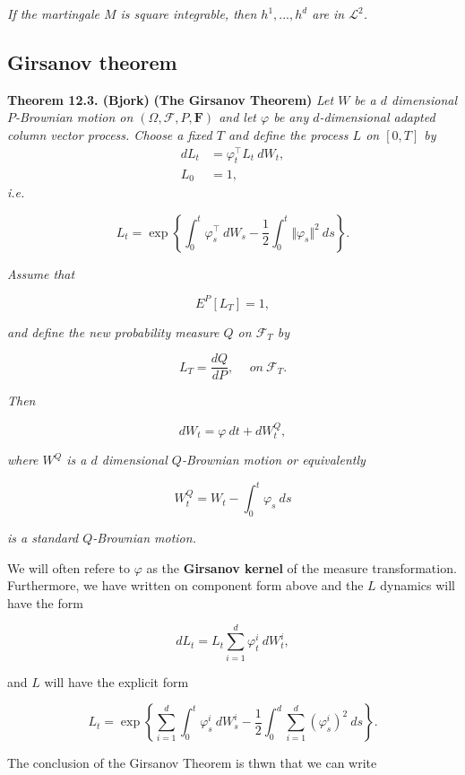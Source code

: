 \documentclass[
]{book}
\begin{document}
\emph{If the martingale \(M\) is square integrable, then \(h^1,...,h^d\) are in \(\mathcal{L}^2\).}

\hypertarget{girsanov-theorem}{%
\subsection{Girsanov theorem}\label{girsanov-theorem}}

\textbf{Theorem 12.3. (Bjork)} \textbf{(The Girsanov Theorem)} \emph{Let \(W\) be a \(d\) dimensional \(P\)-Brownian motion on \((\Omega,\mathcal{F},P,\mathbf{F})\) and let \(\varphi\) be any \(d\)-dimensional adapted column vector process. Choose a fixed \(T\) and define the process \(L\) on \([0,T]\) by}
\begin{align*}
dL_t&=\varphi^\top_t L_t\ dW_t,\tag{12.16}\\
L_0&=1,\tag{12.17}
\end{align*}
\emph{i.e.}

\[
L_t = \exp\left\{\int_0^t \varphi^\top_s\ dW_s - \frac{1}{2}\int_0^t \Vert\varphi_s\Vert ^2\ ds\right\}.
\]

\emph{Assume that}

\[
E^P[L_T]=1,\tag{12.18}
\]

\emph{and define the new probability measure \(Q\) on \(\mathcal{F}_T\) by}

\[
L_T=\frac{dQ}{dP},\hspace{15pt}on\ \mathcal{F}_T.\tag{12.19}
\]

\emph{Then}

\[
dW_t=\varphi\ dt+dW_t^Q,\tag{12.20}
\]

\emph{where \(W^Q\) is a \(d\) dimensional \(Q\)-Brownian motion or equivalently}

\[
W_t^Q=W_t-\int_0^t\varphi_s\ ds\tag{12.21}
\]

\emph{is a standard \(Q\)-Brownian motion.}

We will often refere to \(\varphi\) as the \textbf{Girsanov kernel} of the measure transformation. Furthermore, we have written on component form above and the \(L\) dynamics will have the form

\[
dL_t=L_t\sum_{i=1}^d\varphi^i_t\ dW_t^i,
\]

and \(L\) will have the explicit form

\[
L_t=\exp\left\{\sum_{i=1}^d\int_0^t\varphi^i_s\ dW_s^i - \frac{1}{2}\int_0^d\sum_{i=1}^d(\varphi^i_s)^2\ ds\right\}.
\]

The conclusion of the Girsanov Theorem is thwn that we can write
\end{document}
